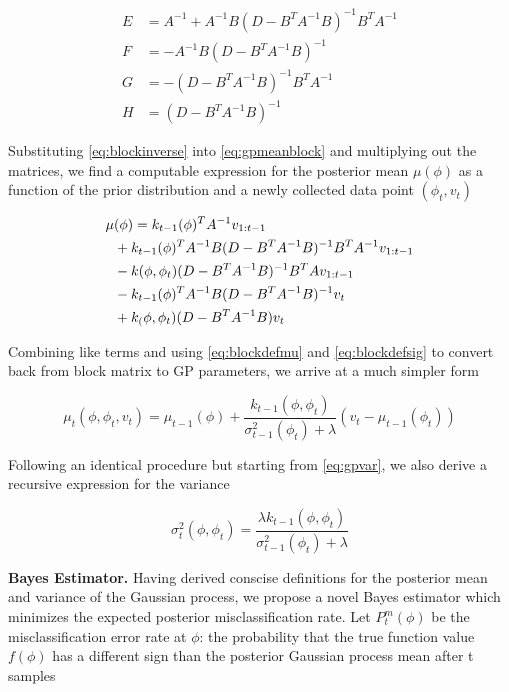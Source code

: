 \documentclass{amsart}
\begin{document}
\begin{align}
    E &= A^{-1}+A^{-1}B(D-B^T A^{-1} B)^{-1}B^T A^{-1} \nonumber \\
    F &= -A^{-1}B(D-B^T A^{-1} B)^{-1} \nonumber \\
    G &= -(D-B^T A^{-1} B)^{-1}B^T A^{-1} \nonumber \\
    H &= (D-B^T A^{-1} B)^{-1} \nonumber
\end{align}
\smallskip

Substituting \eqref{eq:blockinverse} into \eqref{eq:gpmeanblock} and multiplying out the matrices, we find a computable expression for the posterior mean $\mu(\phi)$ as a function of the prior distribution and a newly collected data point $(\phi_t,v_t)$

\begin{align}
\begin{split}
    \tiny
    \mu&(\phi) = k_{t-1}(\phi)^T A^{-1} v_{1:t-1} \\
    &+ k_{t-1}(\phi)^T A^{-1} B (D-B^T A^{-1} B)^{-1} B^T A^{-1} v_{1:t-1} \\
    &- k(\phi,\phi_t)(D-B^T A^{-1} B)^{-1} B^T A v_{1:t-1} \\
    &- k_{t-1}(\phi)^T A^{-1} B(D-B^T A^{-1}B)^{-1}v_t \\
    &+ k_(\phi,\phi_t)(D-B^T A^{-1}B)v_t
\end{split}
\end{align}

Combining like terms and using \eqref{eq:blockdefmu} and \eqref{eq:blockdefsig} to convert back from block matrix to GP parameters, we arrive at a much simpler form

\begin{equation}
    \mu_t(\phi,\phi_t,v_t) = \mu_{t-1}(\phi) + \frac{k_{t-1}(\phi,\phi_t)}{\sigma_{t-1}^2(\phi_t)+\lambda}(v_t-\mu_{t-1}(\phi_t))
    \label{eq:recmu}
\end{equation}

Following an identical procedure but starting from \eqref{eq:gpvar}, we also derive a recursive expression for the variance

\begin{equation}
    \sigma_t^2(\phi,\phi_t) = \frac{\lambda k_{t-1}(\phi,\phi_t)}{\sigma_{t-1}^2(\phi_t)+\lambda}
    \label{eq:recsig}
\end{equation}
\smallskip

\noindent\textbf{Bayes Estimator.} Having derived conscise definitions for the posterior mean and variance of the Gaussian process, we propose a novel Bayes estimator which minimizes the expected posterior misclassification rate. Let $P^m_t(\phi)$ be the misclassification error rate at $\phi$: the probability that the true function value $f(\phi)$ has a different sign than the posterior Gaussian process mean after t samples
\end{document}
